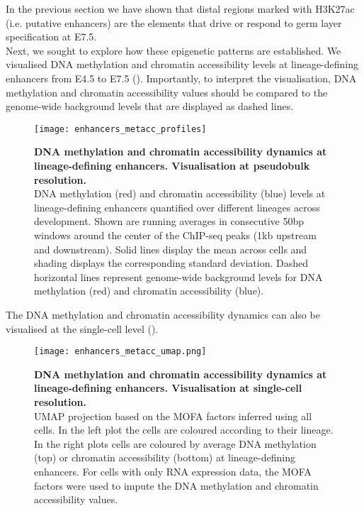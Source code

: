 In the previous section we have shown that distal regions marked with H3K27ac (i.e. putative enhancers) are the elements that drive or respond to germ layer specification at E7.5.\\
Next, we sought to explore how these epigenetic patterns are established. We visualised DNA methylation and chromatin accessibility levels at lineage-defining enhancers from E4.5 to E7.5 (). Importantly, to interpret the visualisation, DNA methylation and chromatin accessibility values should be compared to the genome-wide background levels that are displayed as dashed lines.

\begin{figure}[H]
	\centering
	\texttt{[image: enhancers\_metacc\_profiles]}
	\caption[]{
	\textbf{DNA methylation and chromatin accessibility dynamics at lineage-defining enhancers. Visualisation at pseudobulk resolution.} \\
	DNA methylation (red) and chromatin accessibility (blue) levels at lineage-defining enhancers quantified over different lineages across development. Shown are running averages in consecutive 50bp windows around the center of the ChIP-seq peaks (1kb upstream and downstream). Solid lines display the mean across cells and shading displays the corresponding standard deviation. Dashed horizontal lines represent genome-wide background levels for DNA methylation (red) and chromatin accessibility (blue).
	}
	\label{fig:enhancers_metacc_profiles}
\end{figure}

The DNA methylation and chromatin accessibility dynamics can also be visualised at the single-cell level ().

\begin{figure}[H]
	\centering
	\texttt{[image: enhancers\_metacc\_umap.png]}
	\caption[]{
	\textbf{DNA methylation and chromatin accessibility dynamics at lineage-defining enhancers. Visualisation at single-cell resolution.} \\
	UMAP projection based on the MOFA factors inferred using all cells. In the left plot the cells are coloured according to their lineage. In the right plots cells are coloured by average DNA methylation (top) or chromatin accessibility (bottom) at lineage-defining enhancers. For cells with only RNA expression data, the MOFA factors were used to impute the DNA methylation and chromatin accessibility values.
	}
	\label{fig:enhancers_metacc_umap}
\end{figure}

